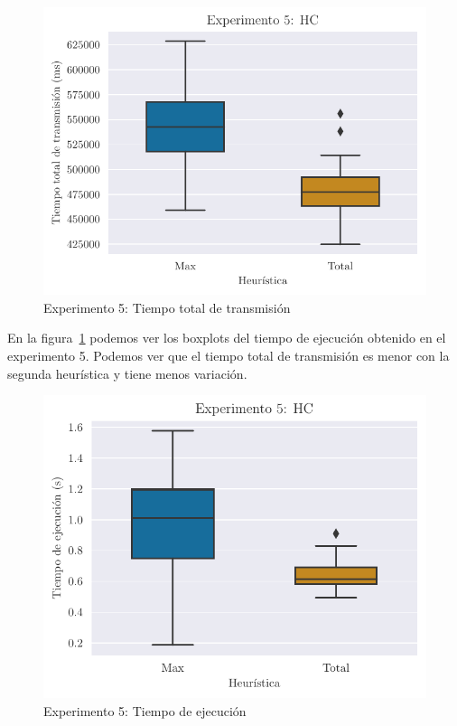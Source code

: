 \begin{figure}[H]
    \centering
    \includegraphics{include/plots/ex5_ttt_bplot.pdf}
    \caption{Experimento 5: Tiempo total de transmisión}%
    \label{fig:ex5ttt}
\end{figure}

En la figura~\ref{fig:ex5ttt} podemos ver los boxplots del tiempo de ejecución obtenido en el experimento 5.
Podemos ver que el tiempo total de transmisión es menor con la segunda heurística y tiene menos variación.

\begin{figure}[H]
    \centering
    \includegraphics{include/plots/ex5_time_bplot.pdf}
    \caption{Experimento 5: Tiempo de ejecución}%
    \label{fig:ex5time}
\end{figure}

